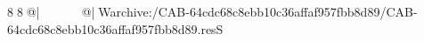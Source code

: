 8  8  @|                                                  @| W   archive:/CAB-64cdc68c8ebb10c36affaf957fbb8d89/CAB-64cdc68c8ebb10c36affaf957fbb8d89.resS 